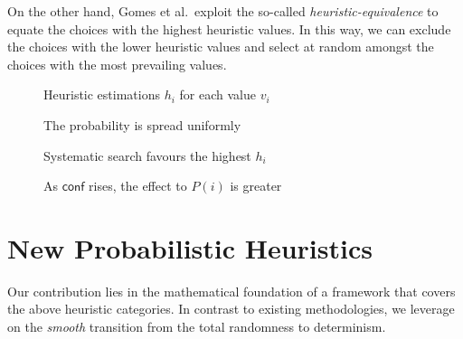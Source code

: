\documentclass{ws-ijait}
\begin{document}
On the other hand, Gomes et al.\ exploit the so-called
\emph{heuristic-equivalence} to equate the choices with the
highest heuristic values. In this way, we can exclude the
choices with the lower heuristic values and select at random
amongst the choices with the most prevailing
values.\cite{equivalence}

\begin{figure}
  \centering
  
  \caption{Heuristic estimations $h_i$ for each value
           $v_i$\label{heuristics}}
\end{figure}

\begin{figure}
  \centering
  
  \caption{The probability is spread
           uniformly\label{uniform}}
\end{figure}

\begin{figure}
  \centering
  
  \caption{Systematic search favours the highest
           $h_i$\label{systematic}}
\end{figure}

\begin{figure}
  \centering
  
  \caption{As $\mathsf{conf}$ rises, the effect to $P(i)$ is
           greater\label{conf}}
\end{figure}


\section{New Probabilistic Heuristics}

Our contribution lies in the mathematical foundation of a
framework that covers the above heuristic categories. In
contrast to existing methodologies, we leverage on the
\emph{smooth} transition from the total randomness to
determinism.
\end{document}
